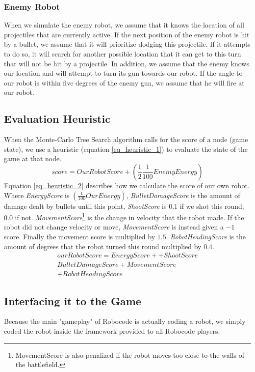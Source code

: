 \subsubsection{Enemy Robot}
When we simulate the enemy robot, we assume that it knows the location of all projectiles that are currently active. If the next position of the enemy robot is hit by a bullet, we assume that it will prioritize dodging this projectile. If it attempts to do so, it will search for another possible location that it can get to this turn that will not be hit by a projectile. In addition, we assume that the enemy knows our location and will attempt to turn its gun towards our robot. If the angle to our robot is within five degrees of the enemy gun, we assume that he will fire at our robot.

\subsection{Evaluation Heuristic}
When the Monte-Carlo Tree Search algorithm calls for the score of a node (game state), we use a heuristic (equation \ref{eq_heuristic_1}) to evaluate the state of the game at that node. 
\begin{equation}
\label{eq_heuristic_1}
score = OurRobotScore +  (\frac{1}{2} \frac{1}{100} EnemyEnergy)
\end{equation}
Equation \ref{eq_heuristic_2} describes how we calculate the score of our own robot.
\\Where \textit{EnergyScore} is $(\frac{1}{100}OurEnergy)$, \textit{BulletDamageScore} is the amount of damage dealt by bullets until this point, \textit{ShootScore} is 0.1 if we shot this round; 0.0 if not. \textit{MovementScore}\footnote{MovementScore is also penalized if the robot moves too close to the walls of the battlefield.} is the change in velocity that the robot made. If the robot did not change velocity or move, \textit{MovementScore} is instead given a $-1$ score. Finally the movement score is multiplied by $1.5$. \textit{RobotHeadingScore} is the amount of degrees that the robot turned this round multiplied by 0.4.
\begin{equation}
\begin{split}
\label{eq_heuristic_2}
ourRobotScore = EnergyScore++ShootScore\\
BulletDamageScore+MovementScore\\
+RobotHeadingScore
\end{split}
\end{equation}

\subsection{Interfacing it to the Game}
Because the main "gameplay" of Robocode is actually coding a robot, we simply coded the robot inside the framework provided to all Robocode players.
